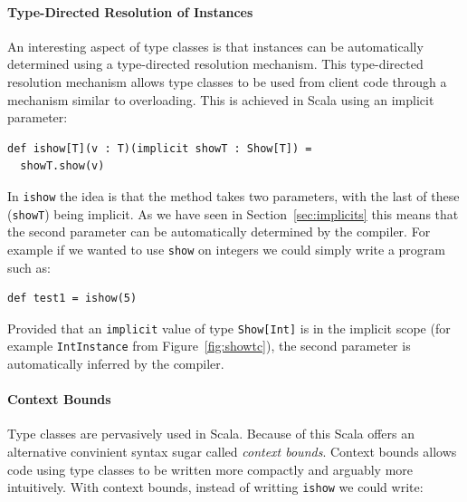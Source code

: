 \documentclass[preprint,nocopyrightspace]{sigplanconf}
\begin{document}


\paragraph{Type-Directed Resolution of Instances} An interesting
aspect of type classes is that instances can be automatically
determined using a type-directed resolution mechanism. This
type-directed resolution mechanism allows type classes
to be used from client code through a mechanism similar to
overloading. This is achieved in Scala using an implicit
parameter:

\begin{lstlisting}
def ishow[T](v : T)(implicit showT : Show[T]) =
  showT.show(v)
\end{lstlisting}

In \lstinline{ishow} the idea is that the method takes two parameters,
with the last of these (\lstinline{showT}) being implicit. As we have
seen in Section~\ref{sec:implicits} this means that the second
parameter can be automatically determined by the compiler.  For
example if we wanted to use \lstinline{show} on integers we could
simply write a program such as:

\begin{lstlisting}
def test1 = ishow(5)
\end{lstlisting}

Provided that an \lstinline{implicit} value of type
\lstinline{Show[Int]} is in the implicit scope (for example
\lstinline{IntInstance} from Figure~\ref{fig:showtc}), the second
parameter is automatically inferred by the compiler.

\paragraph{Context Bounds} Type classes are pervasively used in
Scala. Because of this Scala offers an alternative convinient syntax sugar called
\emph{context bounds}. Context bounds allows code using type classes to be
written more compactly and arguably more intuitively. With context
bounds, instead of writting \lstinline{ishow} we could write:
\end{document}
